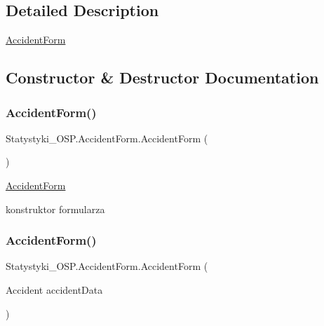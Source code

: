 \subsection{Detailed Description}
\mbox{\hyperlink{class_statystyki___o_s_p_1_1_accident_form}{Accident\+Form}} 



\subsection{Constructor \& Destructor Documentation}
\mbox{\label{class_statystyki___o_s_p_1_1_accident_form_a1d88380db8b7bdadee7138133076a4f1}} 
\subsubsection{\texorpdfstring{AccidentForm()}{AccidentForm()}\hspace{0.1cm}{\footnotesize\ttfamily [1/2]}}
{\footnotesize\ttfamily Statystyki\+\_\+\+O\+S\+P.\+Accident\+Form.\+Accident\+Form (\begin{DoxyParamCaption}{ }\end{DoxyParamCaption})}



\mbox{\hyperlink{class_statystyki___o_s_p_1_1_accident_form}{Accident\+Form}} 

konstruktor formularza\mbox{\label{class_statystyki___o_s_p_1_1_accident_form_a153ee0674c96f0736f2931c7030c9156}} 
\subsubsection{\texorpdfstring{AccidentForm()}{AccidentForm()}\hspace{0.1cm}{\footnotesize\ttfamily [2/2]}}
{\footnotesize\ttfamily Statystyki\+\_\+\+O\+S\+P.\+Accident\+Form.\+Accident\+Form (\begin{DoxyParamCaption}\item[{Accident}]{accident\+Data }\end{DoxyParamCaption})}



